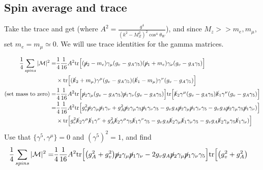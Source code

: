 \documentclass[11pt]{article}
\begin{document}
\subsection{Spin average and trace}

\begin{flushleft}

Take the trace and get (where $A^2 = \frac{g^4}{(k^2 - M_Z^2)^2\cos^4 \theta_W} $), and since $M_z >> m_e, m_{\mu}$, set $m_e = m_{\mu} \simeq 0$. We will use trace identities for the gamma matrices.

\begin{align*}
\frac{1}{4} \sum_{spins} |\mathcal{M}|^2 =& \frac{1}{4} \frac{1}{16} A^2 \text{tr}
\Big[ (\cancel{p}_2 -m_e)  
\gamma_{\mu} (g_v - g_A \gamma_5) (\cancel{p}_1 + m_e) 
\gamma_{\nu} (g_v - g_A \gamma_5)\Big]\\
& \times \text{tr} \Big[
(\cancel{k}_2 + m_{\mu}) \gamma^{\mu} (g_v - g_A \gamma_5) (\cancel{k}_1 - m_{\mu}) \gamma^{\nu} (g_v - g_A \gamma_5) 
\Big]\\
\text{(set mass to zero)}
=& \frac{1}{4} \frac{1}{16} A^2 \text{tr}
\Big[ \cancel{p}_2 
\gamma_{\mu} (g_v - g_A \gamma_5) \cancel{p}_1 
\gamma_{\nu} (g_v - g_A \gamma_5)\Big]
\text{tr} \Big[
\cancel{k}_2 \gamma^{\mu} (g_v - g_A \gamma_5) \cancel{k}_1 \gamma^{\nu} (g_v - g_A \gamma_5) 
\Big]\\
=& \frac{1}{4} \frac{1}{16} A^2 \text{tr} \Big[ g_v^2 \cancel{p}_2 
\gamma_{\mu} \cancel{p}_1 \gamma_{\nu} 
+ g_A^2 \cancel{p}_2 \gamma_{\mu} \gamma_5
 \cancel{p}_1 \gamma_{\nu} \gamma_5 - g_v g_A \cancel{p}_2 
\gamma_{\mu} \cancel{p}_1 \gamma_{\nu} \gamma_5
- g_v g_A \cancel{p}_2 \gamma_{\mu} \gamma_5 \cancel{p}_1 \gamma_{\nu}) \Big] \\
& \times
\text{tr} \Big[
g_v^2
\cancel{k}_2 \gamma^{\mu} 
 \cancel{k}_1 \gamma^{\nu} 
+g_A^2
\cancel{k}_2 \gamma^{\mu} \gamma_5
 \cancel{k}_1 \gamma^{\nu} \gamma_5 
- g_v g_A 
\cancel{k}_2 
\gamma_{\mu} \cancel{k}_1 
\gamma_{\nu} \gamma_5
- g_v g_A \cancel{k}_2 
\gamma_{\mu} \gamma_5 \cancel{k}_1 
\gamma_{\nu})
\Big] \\
\end{align*}
Use that $\{\gamma^5, \gamma^{\mu}\}=0$ and $(\gamma^5)^2 = 1$, and find
\begin{align*}
\frac{1}{4} \sum_{spins} |\mathcal{M}|^2 =& \frac{1}{4} \frac{1}{16} A^2 \text{tr}
\Big[  
\big(g_A^2 + g_v^2\big)
\cancel{p}_2 
\gamma_{\mu} 
 \cancel{p}_1 
\gamma_{\nu} 
- 2 g_v g_A 
\cancel{p}_2 
\gamma_{\mu} \cancel{p}_1 
\gamma_{\nu} \gamma_5 \Big]
\text{tr} \Big[
\big( g_v^2 +g_A^2 \big)

\end{align*}
\end{flushleft}
\end{document}
